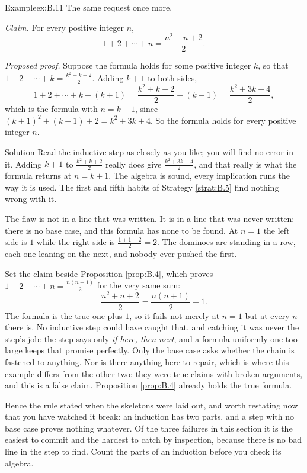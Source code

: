 \documentclass[a4paper,12pt,oneside]{memoir}
\begin{document}
\begin{workedexample}
\begin{envexample}{Example}{ex:B.11}{}
The same request once more.

\emph{Claim.} For every positive integer \(n\), \[ 1 + 2 + \cdots + n = \frac{n^{2} + n + 2}{2}. \]

\emph{Proposed proof.} Suppose the formula holds for some positive integer \(k\), so that \(1 + 2 + \cdots + k = \frac{k^{2} + k + 2}{2}\). Adding \(k + 1\) to both sides, \[ 1 + 2 + \cdots + k + (k + 1) = \frac{k^{2} + k + 2}{2} + (k + 1) = \frac{k^{2} + 3k + 4}{2}, \] which is the formula with \(n = k + 1\), since \((k + 1)^{2} + (k + 1) + 2 = k^{2} + 3k + 4\). So the formula holds for every positive integer \(n\).
\end{envexample}
\begin{envsolution}{Solution}{}{}
Read the inductive step as closely as you like; you will find no error in it. Adding \(k + 1\) to \(\frac{k^{2} + k + 2}{2}\) really does give \(\frac{k^{2} + 3k + 4}{2}\), and that really is what the formula returns at \(n = k + 1\). The algebra is sound, every implication runs the way it is used. The first and fifth habits of Strategy \ref{strat:B.5} find nothing wrong with it.

The flaw is not in a line that was written. It is in a line that was never written: there is no base case, and this formula has none to be found. At \(n = 1\) the left side is \(1\) while the right side is \(\frac{1 + 1 + 2}{2} = 2\). The dominoes are standing in a row, each one leaning on the next, and nobody ever pushed the first.

Set the claim beside Proposition \ref{prop:B.4}, which proves \(1 + 2 + \cdots + n = \frac{n(n + 1)}{2}\) for the very same sum: \[ \frac{n^{2} + n + 2}{2} = \frac{n(n + 1)}{2} + 1. \] The formula is the true one plus \(1\), so it fails not merely at \(n = 1\) but at every \(n\) there is. No inductive step could have caught that, and catching it was never the step’s job: the step says only \emph{if here, then next}, and a formula uniformly one too large keeps that promise perfectly. Only the base case asks whether the chain is fastened to anything. Nor is there anything here to repair, which is where this example differs from the other two: they were true claims with broken arguments, and this is a false claim. Proposition \ref{prop:B.4} already holds the true formula.

Hence the rule stated when the skeletons were laid out, and worth restating now that you have watched it break: an induction has two parts, and a step with no base case proves nothing whatever. Of the three failures in this section it is the easiest to commit and the hardest to catch by inspection, because there is no bad line in the step to find. Count the parts of an induction before you check its algebra.
\end{envsolution}
\end{workedexample}
\end{document}
